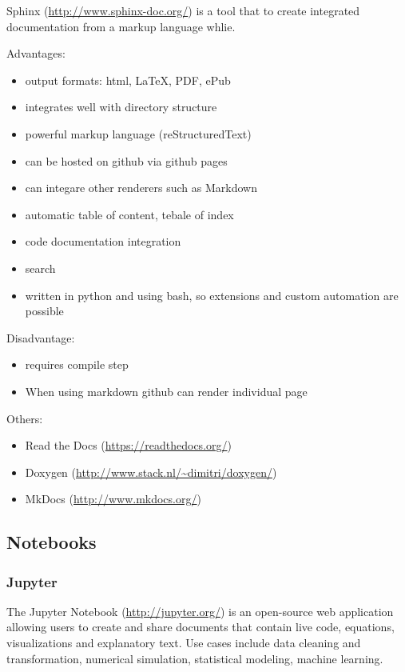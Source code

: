 Sphinx (\url{http://www.sphinx-doc.org/}) is a tool that to create
integrated documentation from a markup language whlie.

Advantages:

\begin{itemize}
\tightlist
\item
  output formats: html, LaTeX, PDF, ePub
\item
  integrates well with directory structure
\item
  powerful markup language (reStructuredText)
\item
  can be hosted on github via github pages
\item
  can integare other renderers such as Markdown
\item
  automatic table of content, tebale of index
\item
  code documentation integration
\item
  search
\item
  written in python and using bash, so extensions and custom automation
  are possible
\end{itemize}

Disadvantage:

\begin{itemize}
\tightlist
\item
  requires compile step
\item
  When using markdown github can render individual page
\end{itemize}

Others:

\begin{itemize}
\tightlist
\item
  Read the Docs (\url{https://readthedocs.org/})
\item
  Doxygen (\url{http://www.stack.nl/~dimitri/doxygen/})
\item
  MkDocs (\url{http://www.mkdocs.org/})
\end{itemize}

\subsection{Notebooks}\label{notebooks}

\subsubsection{Jupyter}\label{jupyter}

The Jupyter Notebook (\url{http://jupyter.org/}) is an open-source web
application allowing users to create and share documents that contain
live code, equations, visualizations and explanatory text. Use cases
include data cleaning and transformation, numerical simulation,
statistical modeling, machine learning.

